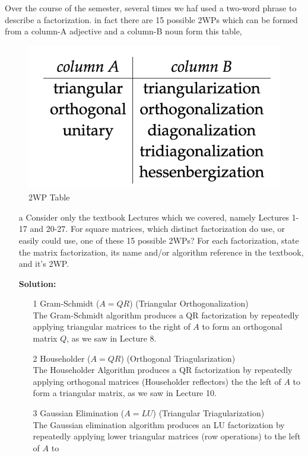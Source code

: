 \documentclass[12pt]{article}
\makeatletter
\theoremstyle{homework}
\newenvironment{exercise}[1]
{\def\@currentlabel{#1}\exercisecore}
{\endexercisecore}
\newcommand{\localhead}[1]{\par\smallskip\noindent\textbf{#1}\nobreak\\}%
\newcommand\solution{\localhead{Solution:}}
\makeatother
\begin{document}
\begin{exercise}{F1} Over the course of the semester, several times we haf used a two-word phrase to describe a factorization. 
  in fact there are 15 possible 2WPs which can be formed from a column-A adjective and a column-B noun form this table, 
    \begin{figure}[H] 
      \begin{center}  
      \caption{2WP Table}  
      \includegraphics[width = .45\textwidth]{table.png}  
      \end{center}  
    \end{figure}
     \begin{enumerate}
      \item[a] Consider only the textbook Lectures which we covered, namely Lectures 1-17 and 20-27. For square matrices, 
      which distinct factorization do use, or easily could use, one of these 15 possible 2WPs? For each
       factorization, state the matrix factorization, its name and/or algorithm
        reference in the textbook, and it's 2WP.\\
      \solution  
      \begin{enumerate}
        \item[1] Gram-Schmidt ($A = QR$) (Triangular Orthogonalization)\\
        The Gram-Schmidt algorithm produces a QR factorization by repeatedly applying triangular matrices 
        to the right of $A$ to form an orthogonal matrix $Q$, as we saw in Lecture 8.
        \vspace{.15in}
        \item[2] Householder ($A = QR$) (Orthogonal Triagularization)\\
        The Householder Algorithm produces a QR factorization by repeatedly applying orthogonal matrices (Householder reflectors) the the left of $A$ 
        to form a triangular matrix, as we saw in Lecture 10.
        \vspace{.15in}
        \item[3] Gaussian Elimination ($A = LU$) (Triangular Triagularization)\\
        The Gaussian elimination algorithm produces an LU factorization by repeatedly applying lower triangular matrices (row operations) to the left of $A$ to 

\end{enumerate}
\end{enumerate}
\end{exercise}
\end{document}
